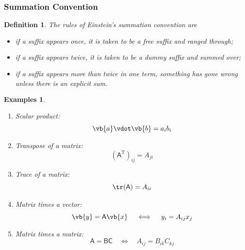 \documentclass{article}
\theoremstyle{plain}\theoremheaderfont{\normalfont\itshape}\theorembodyfont{\rmfamily}\theoremseparator{.}\newtheorem*{rem}{Remark}\newtheorem*{ex}{Example}\newtheorem*{proof}{Proof}\newtheorem*{altp}{Alternative proof}
\theoremstyle{plain}\theoremheaderfont{\normalfont\bfseries}\theorembodyfont{\rmfamily}\theoremseparator{.}\newtheorem{thm}{Theorem}[section]\newtheorem{lem}[thm]{Lemma}\newtheorem{prop}[thm]{Proposition}\newtheorem*{cor}{Corollary}\newtheorem{defn}[thm]{Definition}\newtheorem{clm}[thm]{Claim}\newtheorem{clminproof}{Claim}
\theoremstyle{break}\theoremheaderfont{\normalfont\itshape}\theorembodyfont{\rmfamily}\theoremseparator{.\medskip}\newtheorem*{proofskip}{Proof}\newtheorem*{exs}{Examples}\newtheorem*{rems}{Remarks}
\theoremstyle{break}\theoremheaderfont{\normalfont\bfseries}\theorembodyfont{\rmfamily}\theoremseparator{.\medskip}\newtheorem{lemskip}[thm]{Lemma}\newtheorem{defnskip}[thm]{Definition}\newtheorem{propskip}[thm]{Proposition}\newtheorem{thmskip}[thm]{Theorem}
\numberwithin{equation}{section}
\newcommand{\tp}{^\mathrm{T}}
\begin{document}
	\subsubsection{Summation Convention}
	\begin{defn}
		The rules of \textit{Einstein's summation convention} are
		\begin{itemize}[topsep=0pt]
			\item if a suffix appears once, it is taken to be a \textit{free suffix} and ranged through;
			\item if a suffix appears twice, it is taken to be a \textit{dummy suffix} and summed over;
			\item if a suffix appears more than twice in one term, something has gone wrong unless there is an explicit sum.
		\end{itemize}
	\end{defn}
	\begin{exs}
		\begin{enumerate}[topsep=0pt,label=(\roman*)]
			\item Scalar product:
			\[\vb{a}\vdot\vb{b}=a_ib_i\]
			\item Transpose of a matrix:
			\[(\mathsf{A}\tp)_{ij}=A_{ji}\]
			\item Trace of a matrix:
			\[\tr(\mathsf{A})=A_{ii}\]
			\item Matrix times a vector:
			\[\vb{y}=\mathsf{A}\vb{x}\quad\iff\quad y_i=A_{ij}x_j\]
			\item Matrix times a matrix:
			\[\mathsf{A}=\mathsf{B}\mathsf{C}\quad\iff\quad A_{ij}=B_{ik}C_{kj}\]
		\end{enumerate}
	\end{exs}
	
\end{document}
